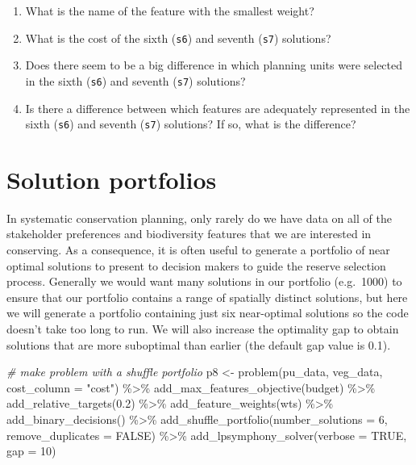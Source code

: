 \documentclass[
  12pt,
]{book}
\makeatletter
\newenvironment{Shaded}{\begin{snugshade}}{\end{snugshade}}
\newcommand{\AttributeTok}[1]{\textcolor[rgb]{0.77,0.63,0.00}{#1}}
\newcommand{\CommentTok}[1]{\textcolor[rgb]{0.56,0.35,0.01}{\textit{#1}}}
\newcommand{\ConstantTok}[1]{\textcolor[rgb]{0.00,0.00,0.00}{#1}}
\newcommand{\DecValTok}[1]{\textcolor[rgb]{0.00,0.00,0.81}{#1}}
\newcommand{\FloatTok}[1]{\textcolor[rgb]{0.00,0.00,0.81}{#1}}
\newcommand{\FunctionTok}[1]{\textcolor[rgb]{0.00,0.00,0.00}{#1}}
\newcommand{\NormalTok}[1]{#1}
\newcommand{\OtherTok}[1]{\textcolor[rgb]{0.56,0.35,0.01}{#1}}
\newcommand{\SpecialCharTok}[1]{\textcolor[rgb]{0.00,0.00,0.00}{#1}}
\newcommand{\StringTok}[1]{\textcolor[rgb]{0.31,0.60,0.02}{#1}}
\providecommand{\tightlist}{%
  \setlength{\itemsep}{0pt}\setlength{\parskip}{0pt}}
\newenvironment{kframe}{%
\medskip{}
\setlength{\fboxsep}{.8em}
 \def\at@end@of@kframe{}%
 \ifinner\ifhmode%
  \def\at@end@of@kframe{\end{minipage}}%
  \begin{minipage}{\columnwidth}%
 \fi\fi%
 \def\FrameCommand##1{\hskip\@totalleftmargin \hskip-\fboxsep
 \colorbox{shadecolor}{##1}\hskip-\fboxsep
     \hskip-\linewidth \hskip-\@totalleftmargin \hskip\columnwidth}%
 \MakeFramed {\advance\hsize-\width
   \@totalleftmargin\z@ \linewidth\hsize
   \@setminipage}}%
 {\par\unskip\endMakeFramed%
 \at@end@of@kframe}
\newenvironment{rmdblock}[1]
  {
  \begin{itemize}
  \renewcommand{\labelitemi}{
    \raisebox{-.7\height}[0pt][0pt]{
      {\setkeys{Gin}{width=3em,keepaspectratio}\texttt{[image: images/\#1]}}
    }
  }
  \setlength{\fboxsep}{1em}
  \begin{kframe}
  \item
  }
  {
  \end{kframe}
  \end{itemize}
  }
\newenvironment{rmdquestion}
  {\begin{rmdblock}{question}}
  {\end{rmdblock}}
\makeatother
\begin{document}
\begin{rmdquestion}
\begin{enumerate}
\def\labelenumi{\arabic{enumi}.}
\tightlist
\item
  What is the name of the feature with the smallest weight?
\item
  What is the cost of the sixth (\texttt{s6}) and seventh (\texttt{s7}) solutions?
\item
  Does there seem to be a big difference in which planning units were selected in the sixth (\texttt{s6}) and seventh (\texttt{s7}) solutions?
\item
  Is there a difference between which features are adequately represented in the sixth (\texttt{s6}) and seventh (\texttt{s7}) solutions? If so, what is the difference?
\end{enumerate}
\end{rmdquestion}

\hypertarget{solution-portfolios}{%
\section{Solution portfolios}\label{solution-portfolios}}

In systematic conservation planning, only rarely do we have data on all of the stakeholder preferences and biodiversity features that we are interested in conserving. As a consequence, it is often useful to generate a portfolio of near optimal solutions to present to decision makers to guide the reserve selection process. Generally we would want many solutions in our portfolio (e.g.~1000) to ensure that our portfolio contains a range of spatially distinct solutions, but here we will generate a portfolio containing just six near-optimal solutions so the code doesn't take too long to run. We will also increase the optimality gap to obtain solutions that are more suboptimal than earlier (the default gap value is 0.1).

\begin{Shaded}
\begin{Highlighting}[]
\CommentTok{\# make problem with a shuffle portfolio}
\NormalTok{p8 }\OtherTok{\textless{}{-}} \FunctionTok{problem}\NormalTok{(pu\_data, veg\_data, }\AttributeTok{cost\_column =} \StringTok{"cost"}\NormalTok{) }\SpecialCharTok{\%\textgreater{}\%}
      \FunctionTok{add\_max\_features\_objective}\NormalTok{(budget) }\SpecialCharTok{\%\textgreater{}\%}
      \FunctionTok{add\_relative\_targets}\NormalTok{(}\FloatTok{0.2}\NormalTok{) }\SpecialCharTok{\%\textgreater{}\%}
      \FunctionTok{add\_feature\_weights}\NormalTok{(wts) }\SpecialCharTok{\%\textgreater{}\%}
      \FunctionTok{add\_binary\_decisions}\NormalTok{() }\SpecialCharTok{\%\textgreater{}\%}
      \FunctionTok{add\_shuffle\_portfolio}\NormalTok{(}\AttributeTok{number\_solutions =} \DecValTok{6}\NormalTok{,}
                            \AttributeTok{remove\_duplicates =} \ConstantTok{FALSE}\NormalTok{) }\SpecialCharTok{\%\textgreater{}\%}
      \FunctionTok{add\_lpsymphony\_solver}\NormalTok{(}\AttributeTok{verbose =} \ConstantTok{TRUE}\NormalTok{, }\AttributeTok{gap =} \DecValTok{10}\NormalTok{)}
\end{Highlighting}
\end{Shaded}
\end{document}
